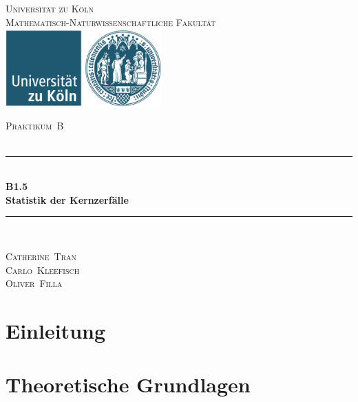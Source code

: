 \documentclass[12pt,a4paper]{scrartcl}
\numberwithin{equation}{section} %
\newcommand{\HRule}{\rule{\linewidth}{0.7mm}}
\begin{document}
\begin{titlepage}
	\pagestyle{empty}

	\begin{center}

	\textsc{\LARGE Universität zu Köln }\\ [0.4cm]
	\textsc{Mathematisch-Naturwissenschaftliche Fakultät} \\[1.5cm]

	\includegraphics[width=0.45\textwidth]{../media/uni.jpg}  %

	\textsc{\Large Praktikum~B}\\[2mm]
	\textsc{}\\[10mm]
	\HRule \\[0.4cm]

		{	\Huge \bfseries B1.5}\\[0.4cm]
			{	\huge \bfseries Statistik der Kernzerfälle}\\[0.3cm]
	
	\HRule \\[3cm]

 	\begin{center}
		\textsc{\Large Catherine~Tran } \\[3pt]
		\textsc{\Large Carlo~Kleefisch } \\[3pt]
		\textsc{\Large Oliver~Filla } \\[3pt]
	\end{center}
	\end{center}
\end{titlepage}

\newpage
\tableofcontents
\newpage

\clearpage
\hypertarget{einleitung}{%
\section{Einleitung}\label{einleitung}}

\clearpage
\hypertarget{theoretische-grundlagen}{%
\section{Theoretische Grundlagen}\label{theoretische-grundlagen}}
\end{document}
